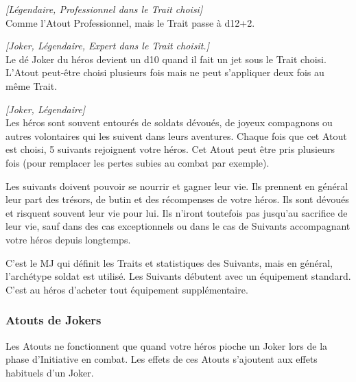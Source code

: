 \begin{description}[align=left]
    \item [Expert]
        \label{sec:atout-expert}
        \emph{[Légendaire, Professionnel dans le Trait choisi]}\\
        Comme l’Atout Professionnel, mais le Trait passe à d12+2.

    \item [Maître]
        \emph{[Joker, Légendaire, Expert dans le Trait choisit.]}\\
        Le dé Joker du héros devient un d10 quand il fait un jet sous le Trait choisi. L’Atout peut-être choisi plusieurs fois mais ne peut s’appliquer deux fois au même Trait.

    \item [Suivants]
        \emph{[Joker, Légendaire]}\\
        Les héros sont souvent entourés de soldats dévoués, de joyeux compagnons ou autres volontaires qui les suivent dans leurs aventures. Chaque fois que cet Atout est choisi, 5 suivants rejoignent votre héros. Cet Atout peut être pris plusieurs fois (pour remplacer les pertes subies au combat par exemple). 

        Les suivants doivent pouvoir se nourrir et gagner leur vie. Ils prennent en général leur part des trésors, de butin et des récompenses de votre héros. Ils sont dévoués et risquent souvent leur vie pour lui. Ils n’iront toutefois pas jusqu’au sacrifice de leur vie, sauf dans des cas exceptionnels ou dans le cas de Suivants accompagnant votre héros depuis longtemps. 

        C’est le MJ qui définit les Traits et statistiques des Suivants, mais en général, l’archétype soldat est utilisé. Les Suivants débutent avec un équipement standard. C’est au héros d’acheter tout équipement supplémentaire.

\end{description}


\subsubsection{Atouts de Jokers}

Les Atouts ne fonctionnent que quand votre héros pioche un Joker lors de la phase d’Initiative en combat. Les effets de ces Atouts s’ajoutent aux effets habituels d’un Joker.

